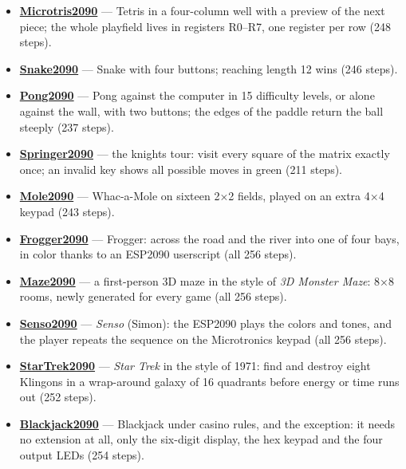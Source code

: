 \documentclass[
  11pt,
  letterpaper,
]{article}
\providecommand{\tightlist}{%
  \setlength{\itemsep}{0pt}\setlength{\parskip}{0pt}}
\begin{document}
\begin{itemize}
\tightlist
\item
  \href{https://github.com/rab-berlin/Microtris2090}{\textbf{Microtris2090}}
  --- Tetris in a four-column well with a preview of the next piece; the
  whole playfield lives in registers R0--R7, one register per row (248
  steps).
\item
  \href{https://github.com/rab-berlin/Snake2090}{\textbf{Snake2090}} ---
  Snake with four buttons; reaching length 12 wins (246 steps).
\item
  \href{https://github.com/rab-berlin/Pong2090}{\textbf{Pong2090}} ---
  Pong against the computer in 15 difficulty levels, or alone against
  the wall, with two buttons; the edges of the paddle return the ball
  steeply (237 steps).
\item
  \href{https://github.com/rab-berlin/Springer2090}{\textbf{Springer2090}}
  --- the knight\textquotesingle s tour: visit every square of the
  matrix exactly once; an invalid key shows all possible moves in green
  (211 steps).
\item
  \href{https://github.com/rab-berlin/Mole2090}{\textbf{Mole2090}} ---
  Whac-a-Mole on sixteen 2×2 fields, played on an extra 4×4 keypad (243
  steps).
\item
  \href{https://github.com/rab-berlin/Frogger2090}{\textbf{Frogger2090}}
  --- Frogger: across the road and the river into one of four bays, in
  color thanks to an ESP2090 userscript (all 256 steps).
\item
  \href{https://github.com/rab-berlin/Maze2090}{\textbf{Maze2090}} --- a
  first-person 3D maze in the style of \emph{3D Monster Maze}: 8×8
  rooms, newly generated for every game (all 256 steps).
\item
  \href{https://github.com/rab-berlin/Senso2090}{\textbf{Senso2090}} ---
  \emph{Senso} (Simon): the ESP2090 plays the colors and tones, and the
  player repeats the sequence on the Microtronic\textquotesingle s
  keypad (all 256 steps).
\item
  \href{https://github.com/rab-berlin/StarTrek2090}{\textbf{StarTrek2090}}
  --- \emph{Star Trek} in the style of 1971: find and destroy eight
  Klingons in a wrap-around galaxy of 16 quadrants before energy or time
  runs out (252 steps).
\item
  \href{https://github.com/rab-berlin/Blackjack2090}{\textbf{Blackjack2090}}
  --- Blackjack under casino rules, and the exception: it needs no
  extension at all, only the six-digit display, the hex keypad and the
  four output LEDs (254 steps).
\end{itemize}
\end{document}
